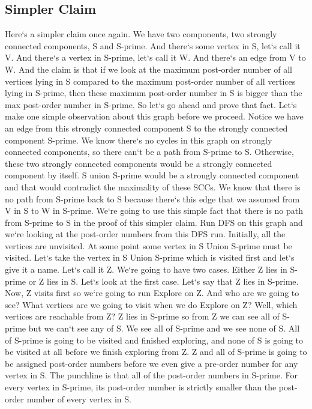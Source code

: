 \subsection{Simpler Claim}
Here`s a simpler claim once again.
We have two components, two strongly connected components, S and S-prime.
And there`s some vertex in S, let`s call it V\@.
And there`s a vertex in S-prime, let`s call it W\@.
And there`s an edge from V to W\@.
And the claim is that if we look at the maximum post-order number of all vertices lying in S compared to the maximum post-order number of all vertices lying in S-prime, then these maximum post-order number in S is bigger than the max post-order number in S-prime.
So let`s go ahead and prove that fact.
Let`s make one simple observation about this graph before we proceed.
Notice we have an edge from this strongly connected component S to the strongly connected component S-prime.
We know there`s no cycles in this graph on strongly connected components, so there can`t be a path from S-prime to S\@.
Otherwise, these two strongly connected components would be a strongly connected component by itself.
S union S-prime would be a strongly connected component and that would contradict the maximality of these SCCs.
We know that there is no path from S-prime back to S because there`s this edge that we assumed from V in S to W in S-prime.
We`re going to use this simple fact that there is no path from S-prime to S in the proof of this simpler claim.
Run DFS on this graph and we`re looking at the post-order numbers from this DFS run.
Initially, all the vertices are unvisited.
At some point some vertex in S Union S-prime must be visited.
Let`s take the vertex in S Union S-prime which is visited first and let`s give it a name.
Let`s call it Z\@.
We`re going to have two cases.
Either Z lies in S-prime or Z lies in S\@.
Let`s look at the first case.
Let`s say that Z lies in S-prime.
Now, Z visits first so we`re going to run Explore on Z\@.
And who are we going to see? What vertices are we going to visit when we do Explore on Z? Well, which vertices are reachable from Z? Z lies in S-prime so from Z we can see all of S-prime but we can`t see any of S\@.
We see all of S-prime and we see none of S\@.
All of S-prime is going to be visited and finished exploring, and none of S is going to be visited at all before we finish exploring from Z\@.
Z and all of S-prime is going to be assigned post-order numbers before we even give a pre-order number for any vertex in S\@.
The punchline is that all of the post-order numbers in S-prime.
For every vertex in S-prime, its post-order number is strictly smaller than the post-order number of every vertex in S\@.

